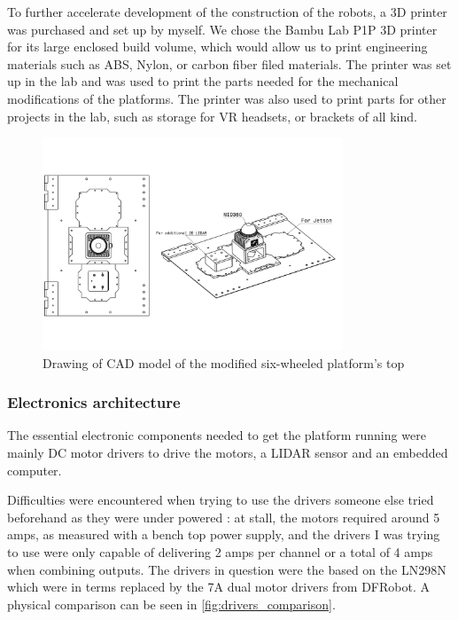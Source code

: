 \documentclass[11pt]{article}
\begin{document}
        To further accelerate development of the construction of the robots, a 3D printer was purchased and set up by myself. We chose the Bambu Lab P1P 3D printer for its large enclosed build volume, which would allow us to print engineering materials such as ABS, Nylon, or carbon fiber filed materials. The printer was set up in the lab and was used to print the parts needed for the mechanical modifications of the platforms. The printer was also used to print parts for other projects in the lab, such as storage for VR headsets, or brackets of all kind.

        \begin{figure}[H]
            \centering
            \includegraphics[width=0.8\textwidth]{Images/RoverV1.pdf}
            \caption{Drawing of CAD model of the modified six-wheeled platform's top}
            \label{fig:full_cad_model}
        \end{figure}

        \subsubsection{Electronics architecture}
            The essential electronic components needed to get the platform running were mainly DC motor drivers to drive the motors, a LIDAR sensor and an embedded computer.
            
            Difficulties were encountered when trying to use the drivers someone else tried beforehand as they were under powered : at stall, the motors required around 5 amps, as measured with a bench top power supply, and the drivers I was trying to use were only capable of delivering 2 amps per channel or a total of 4 amps when combining outputs. The drivers in question were the based on the LN298N which were in terms replaced by the 7A dual motor drivers from DFRobot. A physical comparison can be seen in \ref{fig:drivers_comparison}.
        
\end{document}
